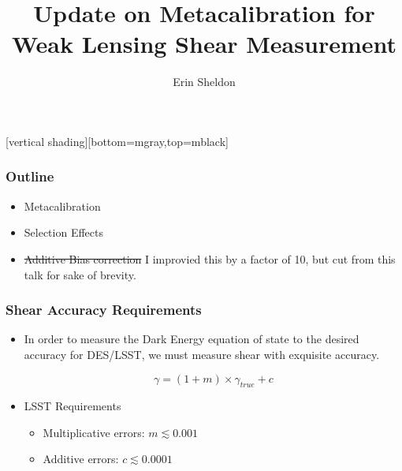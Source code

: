 \documentclass{beamer}
\title{Update on Metacalibration for Weak Lensing Shear Measurement}
\author{Erin Sheldon}
\institute{Brookhaven National Laboratory}
\begin{document}
\frame{\titlepage}


[vertical shading][bottom=mgray,top=mblack]

\frame
{
    \frametitle{Outline}

 
    \begin{itemize}

        \item Metacalibration

        \item Selection Effects

        \item \sout{Additive Bias correction}  I improvied this by a factor of
            10, but cut from this talk for sake of brevity.

    \end{itemize}

}

\frame
{
    \frametitle{Shear Accuracy Requirements}

 
    \begin{itemize}

        \item In order to measure the Dark Energy equation of state
            to the desired accuracy for DES/LSST, we must measure
            shear with exquisite accuracy.

            {\color{lightskyblue}
                \begin{equation}
                    \gamma = (1 + m ) \times \gamma_{true} + c \nonumber
                \end{equation}
            } 

        \item LSST Requirements
            \begin{itemize}
                \item Multiplicative errors: {\color{gold} $m \lesssim 0.001$}
                \item Additive errors: {\color{brightred} $c \lesssim 0.0001$}
            \end{itemize}


    \end{itemize}

}
\end{document}
